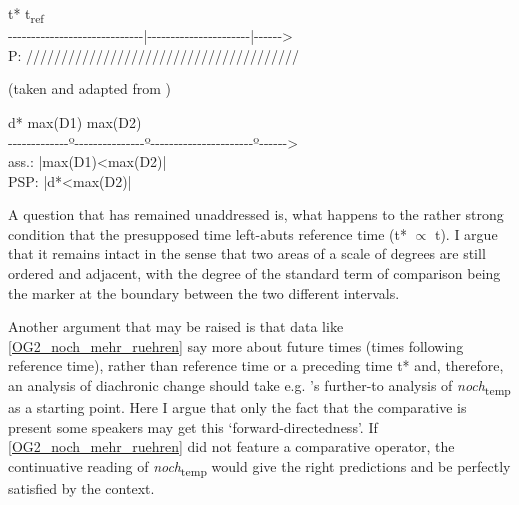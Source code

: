 \documentclass[output=paper,
modfonts
]{langscibook}
\begin{document}
\ea\label{diagram_temp_comp}
\ea \hspace{43} t* \hspace{80} t\textsubscript{ref}\\
{-}{-}{-}{-}{-}{-}{-}{-}{-}{-}{-}{-}{-}{-}{-}{-}{-}{-}{-}{-}{-}{-}{-}{-}{-}{-}{-}{-}{-}{|}{-}{-}{-}{-}{-}{-}{-}{-}{-}{-}{-}{-}{-}{-}{-}{-}{-}{-}{-}{-}{-}{-}{|}{-}{-}{-}{-}{-}{-}>\\
P: \hspace{40}///////////////////////////////////////\\ \begin{flushright} \vspace{-12pt} (taken and adapted from \citep{beck2016a_sub})\end{flushright}\vspace{6pt}
\ex \hspace{43} d* \hspace{30} max(D1) \hspace{42} max(D2)\\
{-}{-}{-}{-}{-}{-}{-}{-}{-}{-}{-}{-}{-}{º}{-}{-}{-}{-}{-}{-}{-}{-}{-}{-}{-}{-}{-}{-}{-}{º}{-}{-}{-}{-}{-}{-}{-}{-}{-}{-}{-}{-}{-}{-}{-}{-}{-}{-}{-}{-}{-}{-}{º}{-}{-}{-}{-}{-}{-}>\\
ass.: \hspace{85}|\hspace{1.125}max(D1)<max(D2)\hspace{1.125}|\\
PSP: \hspace{25}|\hspace{1}d*<max(D2)\hspace{1}|
\z\z

A question that has remained unaddressed is, what happens to the rather strong condition that the presupposed time left-abuts reference time (t* $\propto$ t). I argue that it remains intact in the sense that two areas of a scale of degrees are still ordered and adjacent, with the degree of the standard term of comparison being the marker at the boundary between the two different intervals.

Another argument that may be raised is that data like \ref{OG2_noch_mehr_ruehren} say more about future times (times following reference time), rather than reference time or a preceding time t* and, therefore, an analysis of diachronic change should take e.g. \citeauthor{beck2016a_sub}'s \citeyearpar{beck2016a_sub} further-to analysis of \textit{noch}\textsubscript{temp} as a starting point. Here I argue that only the fact that the comparative is present some speakers may get this `forward-directedness'. If \ref{OG2_noch_mehr_ruehren} did not feature a comparative operator, the continuative reading of \textit{noch}\textsubscript{temp} would give the right predictions and be perfectly satisfied by the context. 
\end{document}
